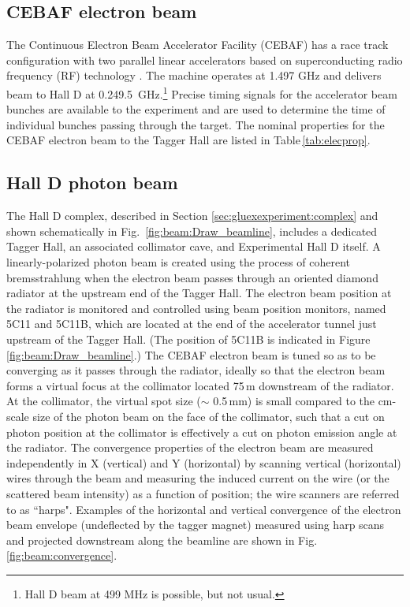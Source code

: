 \subsection{CEBAF electron beam \label{sec:ebeam}}
The Continuous Electron Beam Accelerator Facility (CEBAF) has a race track configuration with two parallel linear accelerators based on superconducting radio frequency (RF) technology \cite{Leemann:2001dg}. The machine operates at 1.497 GHz and delivers beam to Hall D at 0.249.5~GHz.\footnote{Hall D beam at 499 MHz is possible, but not usual.} Precise timing signals for the accelerator beam bunches are available to the experiment and are used to determine the time of individual bunches passing through the target. The nominal properties for the CEBAF electron beam to the Tagger Hall are listed in Table\,\ref{tab:elecprop}.

\subsection{Hall D photon beam \label{sec:gbeam}}
The Hall D complex, described in Section \ref{sec:gluexexperiment:complex} and shown schematically in Fig.~\ref{fig:beam:Draw_beamline}, includes a dedicated Tagger Hall, an associated collimator cave, and Experimental Hall D itself. A linearly-polarized photon beam is created using the process of coherent bremsstrahlung \cite{timm1969,LIVINGSTON2009205} when the electron beam passes through an oriented diamond radiator at the upstream end of the Tagger Hall.
The electron beam position at the radiator is monitored and controlled using beam position monitors, named 5C11 and 5C11B, which are located at the end of the accelerator tunnel just upstream of the Tagger Hall. (The position of 5C11B is indicated in Figure \ref{fig:beam:Draw_beamline}.)
The CEBAF electron beam is tuned 
so as to be converging as it passes through the radiator, ideally
so that the electron beam forms a virtual focus at the collimator 
located 75\,m downstream of the radiator.
At the collimator, the virtual spot size ($\sim$ 0.5\,mm) is small compared to the cm-scale size of the photon beam on the face of the collimator,
such that a cut on photon position at the collimator is effectively a cut on photon emission angle at the radiator. 
The convergence
properties of the electron beam are measured independently 
in X (vertical) and Y (horizontal) 
by scanning vertical (horizontal) wires 
through the beam and measuring the induced current on the wire (or the scattered beam intensity) as a function of position; the wire scanners are referred to as ``harps".
Examples of the horizontal and vertical convergence of the electron beam envelope (undeflected by the tagger magnet)
measured using harp scans and projected downstream along the beamline are shown in Fig.\,\ref{fig:beam:convergence}.

